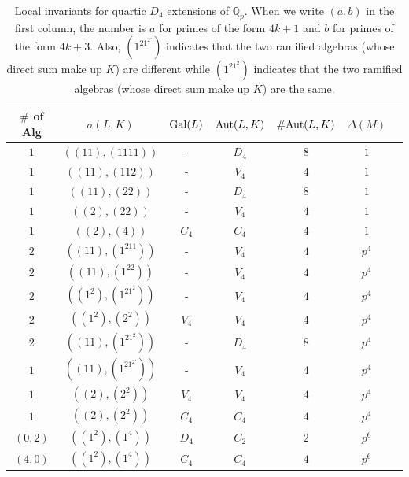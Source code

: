 \documentclass[10pt]{article}
\theoremstyle{plain}
\theoremstyle{definition}
\theoremstyle{remark}
\DeclareMathOperator{\Aut}{Aut}
\def\Gal{{\rm Gal}}
\def\Aut{{\rm Aut}}
\def\Q{{\mathbb Q}}
\def\Q{{\mathbb Q}}
\begin{document}
\begin{table}
\centering
\begin{tabular}{|c|c|c|c|c|c|c|}
\hline
$\#$ of Alg & $\sigma(L,K)$ & $\Gal(L)$ &  $\Aut(L,K)$ &
$\#\Aut(L,K)$ & $\Delta(M)$ \\
\hline
$1$ & $((11),(1111))$ & -   &  $D_4$  & $8$ & $1$ \\
$1$ & $((11),(112))$  & -   &  $V_4$  & $4$ & $1$ \\
$1$ & $((11),(22))$   & -   &  $D_4$  & $8$ & $1$ \\
$1$ & $((2),(22))$    & -   &  $V_4$  & $4$ & $1$ \\
$1$ & $((2),(4))$     & $C_4$ &  $C_4$  & $4$ & $1$ \\
\hline
$2$ & $((11),(1^211))$   & -   & $V_4$  & $4$ & $p^4$\\
$2$ & $((11),(1^22))$    & -   & $V_4$  & $4$ & $p^4$ \\
$2$ & $((1^2),(1^21^2))$ & -   & $V_4$  & $4$ & $p^4$ \\
$2$ & $((1^2),(2^2))$    & $V_4$   & $V_4$  & $4$ & $p^4$ \\
\hline
$2$ & $((11),(1^21^2))$  & -   & $D_4$  & $8$ & $p^4$\\
$1$ & $((11),(1^21^{2'}))$  & -   & $V_4$  & $4$ & $p^4$\\
$1$ & $((2),(2^2))$      & $V_4$   &  $V_4$  & $4$ & $p^4$ \\
$1$ & $((2),(2^2))$      & $C_4$   &  $C_4$  & $4$ & $p^4$\\
$(0,2)$ & $((1^2),(1^4))$    & $D_4$   &  $C_2$  & $2$ & $p^6$ \\
$(4,0)$ & $((1^2),(1^4))$    & $C_4$   &  $C_4$  & $4$ & $p^6$ \\
\hline
\end{tabular}
\caption{Local invariants for quartic $D_4$ extensions of $\Q_p$. When we write $(a,b)$ in the first column, the number is $a$ for primes
of the form $4k+1$ and $b$ for primes of the form $4k+3$. Also, $(1^21^{2'})$ indicates that the two ramified algebras (whose direct sum make up $K$) are different while $(1^21^2)$ indicates that the two ramified algebras (whose direct sum make up $K$) are the same. 
}\label{tab:p}
\end{table}
\end{document}
